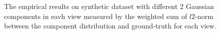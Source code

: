 \documentclass[11pt]{article}
\begin{document}
\begin{figure}
\caption{The empirical results on synthetic dataset with different 2 Gaussian components in eavh view measured by the weighted sum of $l2$-norm between the component distribution and ground-truth for each view.}
\end{figure}
\end{document}
